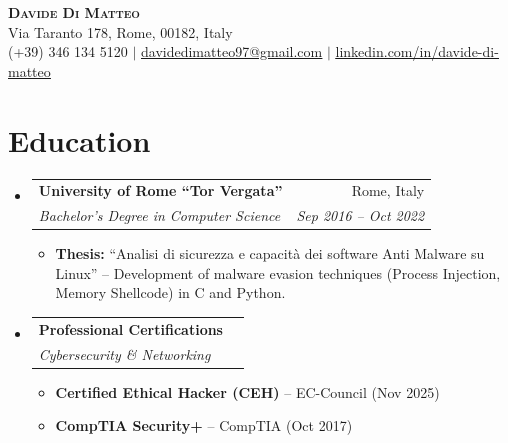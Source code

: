 \documentclass[letterpaper,11pt]{article}
\makeatletter
\newcommand{\resumeItem}[1]{\item\small{{#1\vspace{-2pt}}}}
\newcommand{\resumeSubheading}[4]{
  \vspace{-1pt}\item
  \begin{tabular*}{0.97\textwidth}[t]{l@{\extracolsep{\fill}}r}
    \textbf{#1} & #2 \\
    \textit{\small#3} & \textit{\small#4} \\
  \end{tabular*}\vspace{-3pt}
}
\newcommand{\resumeSubHeadingListStart}{\begin{itemize}[leftmargin=0.15in,label={},topsep=3pt,itemsep=4pt,parsep=0pt]}
\newcommand{\resumeSubHeadingListEnd}{\end{itemize}}
\newcommand{\resumeItemListStart}{\begin{itemize}[topsep=3pt,itemsep=2pt,parsep=0pt]}
\newcommand{\resumeItemListEnd}{\end{itemize}\vspace{-5pt}}
\makeatother
\begin{document}
\begin{center}
  \textbf{\Huge\scshape Davide Di Matteo} \\ \vspace{1pt}
  Via Taranto 178, Rome, 00182, Italy \\ \vspace{1pt}
  \small (+39) 346 134 5120 $|$
  \href{mailto:davidedimatteo97@gmail.com}{\underline{davidedimatteo97@gmail.com}} $|$
  \href{https://linkedin.com/in/davide-di-matteo}{\underline{linkedin.com/in/davide-di-matteo}}
\end{center}

\section{Education}
\resumeSubHeadingListStart
  \resumeSubheading
    {University of Rome ``Tor Vergata''}{Rome, Italy}
    {Bachelor's Degree in Computer Science}{Sep 2016 -- Oct 2022}
    \resumeItemListStart
      \resumeItem{\textbf{Thesis:} ``Analisi di sicurezza e capacità dei software Anti Malware su Linux'' -- Development of malware evasion techniques (Process Injection, Memory Shellcode) in C and Python.}
    \resumeItemListEnd
  \resumeSubheading{Professional Certifications}{}{Cybersecurity \& Networking}{}
    \resumeItemListStart
      \resumeItem{\textbf{Certified Ethical Hacker (CEH)} -- EC-Council (Nov 2025)}
      \resumeItem{\textbf{CompTIA Security+} -- CompTIA (Oct 2017)}
    \resumeItemListEnd
\resumeSubHeadingListEnd
\end{document}
